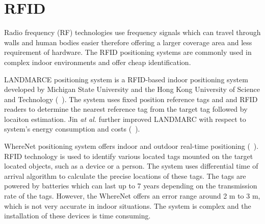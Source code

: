 %

\section{RFID}
\label{sec:rfid}

Radio frequency (RF) technologies use frequency signals 
which can travel through walls and human bodies easier
therefore offering a larger coverage area and
less requirement of hardware. The RFID positioning
systems are commonly used in complex indoor environments
and offer cheap identification.


LANDMARCE positioning system is a RFID-based indoor
positioning system developed by Michigan State University and the Hong Kong
University of Science and Technology (~\citet{ni04}). 
The system uses fixed position reference tags and 
and RFID readers to determine the nearest reference 
tag from the target tag followed by locaiton estimation. 
Jin \emph{at al.} further improved LANDMARC with respect to system's energy consumption
and costs (~\citet{jin06}). 

WhereNet positioning system offers indoor and outdoor real-time positioning 
(~\citet{wherenet08}).
RFID technology is used to identify various located tags mounted 
on the target located objects, such as a device or a person.
The system uses differential time of arrival algorithm to 
calculate the precise locations of these tags.
The tags are powered by batteries which can last up to 7
years depending on the transmission rate of the tags. However,
the WhereNet offers an error range around 2 m to 3 m,
which is not very accurate in indoor situations. The system
is complex and the installation of these devices is
time consuming.


